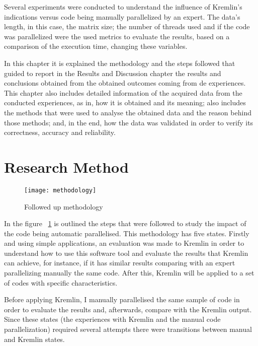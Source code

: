 Several experiments were conducted to understand the influence of Kremlin's indications versus code being manually parallelized  by an expert. The data's length, in this case, the matrix size; the number of threads used and if the code was parallelized were the used metrics to evaluate the results, based on a comparison of the execution time, changing these variables.

In this chapter it is explained the methodology and the steps followed that guided to report in the Results and Discussion chapter the results and conclusions obtained from the obtained outcomes coming from de experiences. This chapter also includes  detailed information of the acquired data from the conducted experiences, as in, how it is obtained and its meaning; also includes the methods that were used to analyse the obtained data and the reason behind those methods; and, in the end, how the data was validated in order to verify its correctness, accuracy and reliability.



\section{Research Method}

\begin{figure}[thb]
	\begin{center}
		\leavevmode
		\texttt{[image: methodology]}
		\caption{Followed up methodology}
		\label{fig:workflow}
	\end{center}
\end{figure}


In the  figure ~\ref{fig:workflow} is outlined the steps that were followed to study the impact of the code being automatic parallelised. This methodology has five states. Firstly and using simple applications, an evaluation was made to Kremlin in order  to understand how to use this software tool and evaluate the results that Kremlin can achieve, for instance, if it has similar results comparing with an expert parallelizing manually the same code. After this, Kremlin will be applied to a set of codes with specific characteristics.

Before applying Kremlin, I manually parallelised the same sample of code in order to evaluate the results and, afterwards, compare with the Kremlin output. Since these states (the experiences with Kremlin and the manual code parallelization) required several attempts there were transitions between manual and Kremlin states. 

